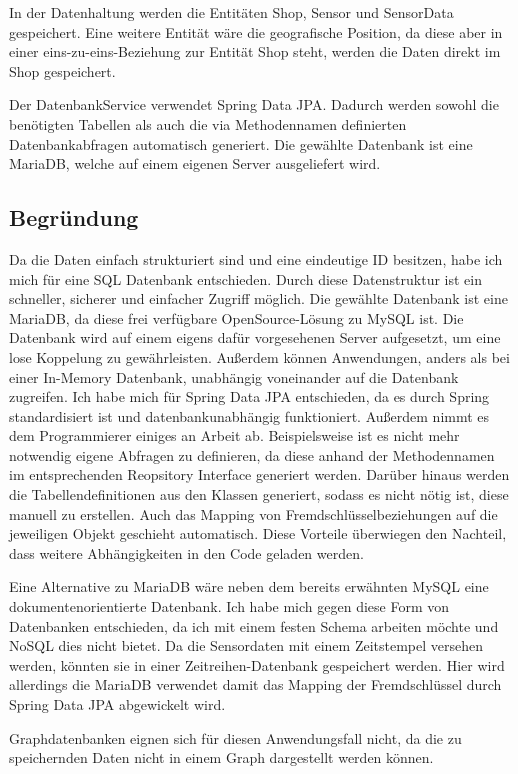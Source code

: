 \documentclass[runningheads]{llncs}
\begin{document}
In der Datenhaltung werden die Entitäten Shop, Sensor und SensorData gespeichert.
Eine weitere Entität wäre die geografische Position, da diese aber in einer eins-zu-eins-Beziehung zur Entität Shop steht, werden die Daten direkt im Shop gespeichert.

Der DatenbankService verwendet Spring Data JPA.
Dadurch werden sowohl die benötigten Tabellen als auch die via Methodennamen definierten Datenbankabfragen automatisch generiert.
Die gewählte Datenbank ist eine MariaDB, welche auf einem eigenen Server ausgeliefert wird.


\subsection{Begründung}
Da die Daten einfach strukturiert sind und eine eindeutige ID besitzen, habe ich mich für eine SQL Datenbank entschieden.
Durch diese Datenstruktur ist ein schneller, sicherer und einfacher Zugriff möglich.
Die gewählte Datenbank ist eine MariaDB, da diese frei verfügbare OpenSource-Lösung zu MySQL ist.
Die Datenbank wird auf einem eigens dafür vorgesehenen Server aufgesetzt, um eine lose Koppelung zu gewährleisten. 
Außerdem können Anwendungen, anders als bei einer In-Memory Datenbank, unabhängig voneinander auf die Datenbank zugreifen.
Ich habe mich für Spring Data JPA entschieden, da es durch Spring standardisiert ist und datenbankunabhängig funktioniert.
Außerdem nimmt es dem Programmierer einiges an Arbeit ab.
Beispielsweise ist es nicht mehr notwendig eigene Abfragen zu definieren, da diese anhand der Methodennamen im entsprechenden Reopsitory Interface generiert werden.
Darüber hinaus werden die Tabellendefinitionen aus den Klassen generiert, sodass es nicht nötig ist, diese manuell zu erstellen.
Auch das Mapping von Fremdschlüsselbeziehungen auf die jeweiligen Objekt geschieht automatisch.
Diese Vorteile überwiegen den Nachteil, dass weitere Abhängigkeiten in den Code geladen werden.

Eine Alternative zu MariaDB wäre neben dem bereits erwähnten MySQL eine dokumentenorientierte Datenbank.
Ich habe mich gegen diese Form von Datenbanken entschieden, da ich mit einem festen Schema arbeiten möchte und NoSQL dies nicht bietet.
Da die Sensordaten mit einem Zeitstempel versehen werden, könnten sie in einer Zeitreihen-Datenbank gespeichert werden.
Hier wird allerdings die MariaDB verwendet damit das Mapping der Fremdschlüssel durch Spring Data JPA abgewickelt wird.

Graphdatenbanken eignen sich für diesen Anwendungsfall nicht, da die zu speichernden Daten nicht in einem Graph dargestellt werden können.
\newpage
\end{document}
